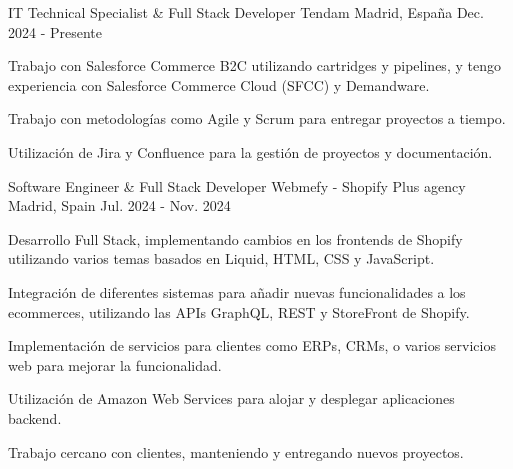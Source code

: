 

\begin{cventries}

\cventry
    {IT Technical Specialist \& Full Stack Developer} %
    {Tendam} %
    {Madrid, España} %
    {Dec. 2024 - Presente} %
    {
      \begin{cvitems} %
        \item {Trabajo con Salesforce Commerce B2C utilizando cartridges y pipelines, y tengo experiencia con Salesforce Commerce Cloud (SFCC) y Demandware.}
        \item {Trabajo con metodologías como Agile y Scrum para entregar proyectos a tiempo.}
        \item {Utilización de Jira y Confluence para la gestión de proyectos y documentación.}
      \end{cvitems}
    }
  \vspace{5.5mm}
\cventry
    {Software Engineer \& Full Stack Developer} %
    {Webmefy - Shopify Plus agency} %
    {Madrid, Spain} %
    {Jul. 2024 - Nov. 2024} %
    {
      \begin{cvitems} %
        \item {Desarrollo Full Stack, implementando cambios en los frontends de Shopify utilizando varios temas basados en Liquid, HTML, CSS y JavaScript.}
        \item {Integración de diferentes sistemas para añadir nuevas funcionalidades a los ecommerces, utilizando las APIs GraphQL, REST y StoreFront de Shopify.}
        \item {Implementación de servicios para clientes como ERPs, CRMs, o varios servicios web para mejorar la funcionalidad.}
        \item {Utilización de Amazon Web Services para alojar y desplegar aplicaciones backend.}
        \item {Trabajo cercano con clientes, manteniendo y entregando nuevos proyectos.}

\end{cvitems}}
\end{cventries}
